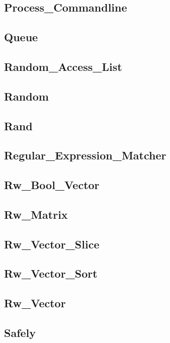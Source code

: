 \subsection{Process\_Commandline}			
\subsection{Queue}					
\subsection{Random\_Access\_List}			
\subsection{Random}					
\subsection{Rand}					
\subsection{Regular\_Expression\_Matcher}		
\subsection{Rw\_Bool\_Vector}				
\subsection{Rw\_Matrix}					
\subsection{Rw\_Vector\_Slice}				
\subsection{Rw\_Vector\_Sort}				
\subsection{Rw\_Vector}					
\subsection{Safely}					
